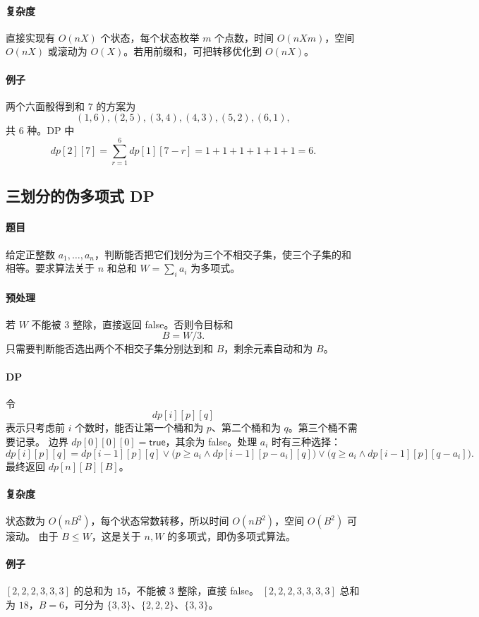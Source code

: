 \documentclass[UTF8,openany,12pt]{ctexbook}
\theoremstyle{remark}
\begin{document}
\paragraph{复杂度}
直接实现有 $O(nX)$ 个状态，每个状态枚举 $m$ 个点数，时间 $O(nXm)$，空间
$O(nX)$ 或滚动为 $O(X)$。若用前缀和，可把转移优化到 $O(nX)$。

\paragraph{例子}
两个六面骰得到和 $7$ 的方案为
\[
  (1,6),(2,5),(3,4),(4,3),(5,2),(6,1),
\]
共 $6$ 种。DP 中
\[
  dp[2][7]=\sum_{r=1}^{6}dp[1][7-r]=1+1+1+1+1+1=6.
\]

\subsection{三划分的伪多项式 DP}

\paragraph{题目}
给定正整数 $a_1,\dots,a_n$，判断能否把它们划分为三个不相交子集，使三个子集的和相等。要求算法关于 $n$ 和总和 $W=\sum_i a_i$ 为多项式。

\paragraph{预处理}
若 $W$ 不能被 $3$ 整除，直接返回 false。否则令目标和
\[
  B=W/3.
\]
只需要判断能否选出两个不相交子集分别达到和 $B$，剩余元素自动和为 $B$。

\paragraph{DP}
令
\[
  dp[i][p][q]
\]
表示只考虑前 $i$ 个数时，能否让第一个桶和为 $p$、第二个桶和为 $q$。第三个桶不需要记录。
边界 $dp[0][0][0]=\mathsf{true}$，其余为 false。处理 $a_i$ 时有三种选择：
\[
dp[i][p][q]=
dp[i-1][p][q]
\vee
\bigl(p\ge a_i\wedge dp[i-1][p-a_i][q]\bigr)
\vee
\bigl(q\ge a_i\wedge dp[i-1][p][q-a_i]\bigr).
\]
最终返回 $dp[n][B][B]$。

\paragraph{复杂度}
状态数为 $O(nB^2)$，每个状态常数转移，所以时间 $O(nB^2)$，空间 $O(B^2)$ 可滚动。
由于 $B\le W$，这是关于 $n,W$ 的多项式，即伪多项式算法。

\paragraph{例子}
$[2,2,2,3,3,3]$ 的总和为 $15$，不能被 $3$ 整除，直接 false。
$[2,2,2,3,3,3,3]$ 总和为 $18$，$B=6$，可分为
$\{3,3\}$、$\{2,2,2\}$、$\{3,3\}$。
\end{document}

